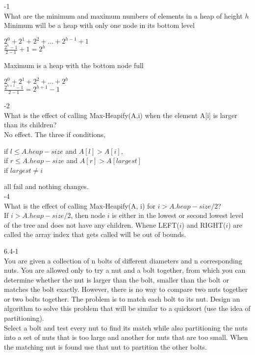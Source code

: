 \documentclass[12pt,largemargins]{homework}
\begin{document}
\maketitle
{}-1\\
What are the minimum and maximum numbers of elements in a heap of height $ h $\\
Minimum will be a heap with only one node in its bottom level\\
\begin{center}
$ 2^0 + 2^1 + 2^2 + ... + 2^{h-1} + 1 $\\
$ \frac{2^{h} - 1 }{2 - 1} + 1 = 2^h$\\
\end{center}
Maximum is a heap with the bottom node full\\
\begin{center}
$ 2^0 + 2^1 + 2^2 + ... + 2^{h}$\\
$ \frac{2^{h+1} - 1}{2 - 1}  = 2^{h + 1} -1$\\
\end{center}
-2\\
What is the effect of calling Max-Heapify(A,i) when the element A[i] is larger than its children?\\

No effect. The three if conditions,
\begin{center}
if $ l \leq A.heap - size $ and $ A[l] >A[i] $,\\
if $ r \leq A.heap - size $ and $ A[r] > A[largest] $\\
if $ largest \neq i $ \\
\end{center}
all fail and nothing changes.\\

-4\\
What is the effect of calling Max-Heapify(A, i) for $ i > A.heap-size/2$?\\

If $ i > A.heap-size/2 $, then node $ i $ is either in the lowest or second lowest level of the tree and does not have any children. Whene LEFT($ i $) and RIGHT($ i $) are called the array index that gets called will be out of bounds.\\

\question

6.4-1\\

\question
You are given a collection of n bolts of different diameters and n corresponding nuts. You are allowed only to try a nut and a bolt together, from which you can determine whether the nut is larger than the bolt, smaller than the bolt or matches the bolt exactly. However, there is no way to compare two nuts together or two bolts together. The problem is to match each bolt to its nut. Design an algorithm to solve this problem that will be similar to a quicksort (use the idea of partitioning).\\ 
Select a bolt and test every nut to find its match while also partitioning the nuts into a set of nuts that is too large and another for nuts that are too small. When the matching nut is found use that nut to partition the other bolts.\\
\end{document}
